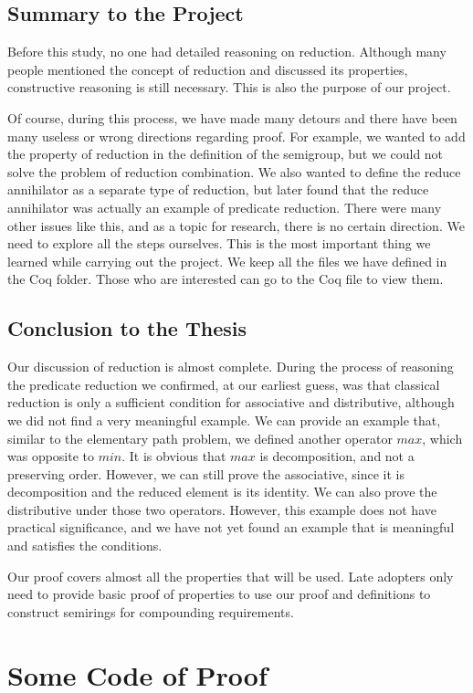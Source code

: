 \documentclass[a4paper,12pt,twoside,openright]{report}
\begin{document}
%
\section{Summary to the Project}
Before this study, no one had detailed reasoning on reduction. Although many people mentioned the concept of reduction and discussed its properties, constructive reasoning is still necessary. This is also the purpose of our project.

Of course, during this process, we have made many detours and there have been many useless or wrong directions regarding proof. For example, we wanted to add the property of reduction in the definition of the semigroup, but we could not solve the problem of reduction combination. We also wanted to define the reduce annihilator as a separate type of reduction, but later found that the reduce annihilator was actually an example of predicate reduction. There were many other issues like this, and as a topic for research, there is no certain direction. We need to explore all the steps ourselves. This is the most important thing we learned while carrying out the project. We keep all the files we have defined in the Coq folder. Those who are interested can go to the Coq file to view them. 

\section{Conclusion to the Thesis}
Our discussion of reduction is almost complete. During the process of reasoning the predicate reduction we confirmed, at our earliest guess, was that classical reduction is only a sufficient condition for associative and distributive, although we did not find a very meaningful example. We can provide an example that, similar to the elementary path problem, we defined another operator $max$, which was opposite to $min$. It is obvious that $max$ is decomposition, and not a preserving order. However, we can still prove the associative, since it is decomposition and the reduced element is its identity. We can also prove the distributive under those two operators. However, this example does not have practical significance, and we have not yet found an example that is meaningful and satisfies the conditions.

Our proof covers almost all the properties that will be used. Late adopters only need to provide basic proof of properties to use our proof and definitions to construct semirings for compounding requirements.

\appendix
\chapter{Some Code of Proof}

\singlespacing


 

\end{document}
